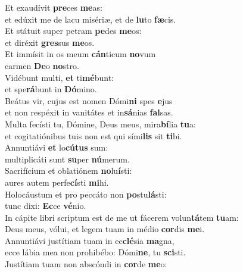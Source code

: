 \evenverse Et exaudívit \textbf{pre}ces \textbf{me}as:~\*\\
\evenverse et edúxit me de lacu misériæ, et de \textbf{lu}to \textbf{fæ}cis.\\
\oddverse Et státuit super petram \textbf{pe}des \textbf{me}os:~\*\\
\oddverse et diréxit \textbf{gres}sus \textbf{me}os.\\
\evenverse Et immísit in os meum \textbf{cán}ticum \textbf{no}vum~\*\\
\evenverse carmen \textbf{De}o \textbf{no}stro.\\
\oddverse Vidébunt multi, \textbf{et} ti\textbf{mé}bunt:~\*\\
\oddverse et spe\textbf{rá}bunt in \textbf{Dó}mino.\\
\evenverse Beátus vir, cujus est nomen Dómi\textbf{ni} spes \textbf{e}jus~\*\\
\evenverse et non respéxit in vanitátes et in\textbf{sá}nias \textbf{fal}sas.\\
\oddverse Multa fecísti tu, Dómine, Deus meus, mira\textbf{bí}lia \textbf{tu}a:~\*\\
\oddverse et cogitatiónibus tuis non est qui sími\textbf{lis} sit \textbf{ti}bi.\\
\evenverse Annuntiávi \textbf{et} lo\textbf{cú}\textbf{tus} sum:~\*\\
\evenverse multiplicáti sunt \textbf{su}per \textbf{nú}merum.\\
\oddverse Sacrifícium et oblatiónem \textbf{no}lu\textbf{í}sti:~\*\\
\oddverse aures autem perfe\textbf{cí}sti \textbf{mi}hi.\\
\evenverse Holocáustum et pro peccáto non \textbf{po}stu\textbf{lá}sti:~\*\\
\evenverse tunc dixi: \textbf{Ec}ce \textbf{vé}nio.\\
\oddverse In cápite libri scriptum est de me ut fácerem volun\textbf{tá}tem \textbf{tu}am:~\*\\
\oddverse Deus meus, vólui, et legem tuam in médio \textbf{cor}dis \textbf{me}i.\\
\evenverse Annuntiávi justítiam tuam in ec\textbf{clé}sia \textbf{ma}gna,~\*\\
\evenverse ecce lábia mea non prohibébo: Dómi\textbf{ne}, tu \textbf{sci}sti.\\
\oddverse Justítiam tuam non abscóndi in \textbf{cor}de \textbf{me}o:~\*\\
